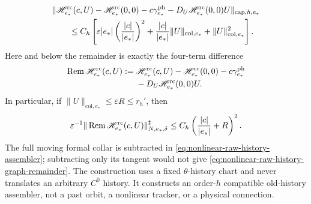 \begin{lemma}
\begin{align}
 &\|\mathscr H_{e_*}^{\rm rc}(c,U)
      -\mathscr H_{e_*}^{\rm rc}(0,0)
      -c\gamma_{e_*}^{\rm ph}
      -D_U\mathscr H_{e_*}^{\rm rc}(0,0)U
        \|_{\mathrm{cap},h,e_*}\notag\\
 &\qquad\le C_h\left[
   \varepsilon|e_*|
       \left(\frac{|c|}{|e_*|}\right)^2
 +\frac{|c|}{|e_*|}\|U\|_{\mathrm{col},e_*}
  +\|U\|_{\mathrm{col},e_*}^2\right].             \label{eq:nonlinear-raw-history-taylor}
\end{align}
Here and below the remainder is exactly the four-term difference
\begin{align}
 \operatorname{Rem}\mathscr H_{e_*}^{\rm rc}(c,U)
 :={}&\mathscr H_{e_*}^{\rm rc}(c,U)
      -\mathscr H_{e_*}^{\rm rc}(0,0)
      -c\gamma_{e_*}^{\rm ph}\notag\\
 &{}-D_U\mathscr H_{e_*}^{\rm rc}(0,0)U.          \label{eq:nonlinear-raw-history-remainder-definition}
\end{align}
In particular, if
\(\|U\|_{\mathrm{col},e_*}\le\varepsilon R\le r_h'\), then
\begin{equation}
 \varepsilon^{-1}
 \|\operatorname{Rem}\mathscr H_{e_*}^{\rm rc}(c,U)
       \|_{N,e_*,\delta}^{\sharp}
 \le C_h\left(\frac{|c|}{|e_*|}+R\right)^2.       \label{eq:nonlinear-raw-history-graph-remainder}
\end{equation}
The full moving formal collar is subtracted in
\cref{eq:nonlinear-raw-history-assembler}; subtracting only its tangent
would not give
\cref{eq:nonlinear-raw-history-graph-remainder}.  The construction uses a
fixed \(\theta\)-history chart and never translates an arbitrary
\(C^0\) history.  It constructs an order-\(h\) compatible old-history
assembler, not a past orbit, a nonlinear tracker, or a physical connection.
\end{lemma}

